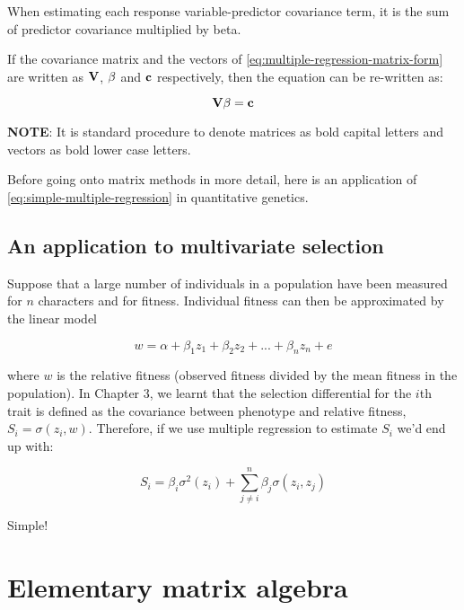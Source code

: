 \documentclass[
]{book}
\begin{document}
When estimating each response variable-predictor covariance term, it is the sum of predictor covariance multiplied by beta.

If the covariance matrix and the vectors of \eqref{eq:multiple-regression-matrix-form} are written as \(\mathbf{V}\), \(\mathbf{\beta}\) and \(\mathbf{c}\) respectively, then the equation can be re-written as:

\begin{equation}
    \mathbf{V\beta} = \mathbf{c}
    \label{eq:abbreviated-multiple-regression}
\end{equation}

\textbf{NOTE}: It is standard procedure to denote matrices as bold capital letters and vectors as bold lower case letters.

Before going onto matrix methods in more detail, here is an application of \eqref{eq:simple-multiple-regression} in quantitative genetics.

\hypertarget{an-application-to-multivariate-selection}{%
\subsection{An application to multivariate selection}\label{an-application-to-multivariate-selection}}

Suppose that a large number of individuals in a population have been measured for \(n\) characters and for fitness. Individual fitness can then be approximated by the linear model

\begin{equation}
    w = \alpha + \beta_1z_1 + \beta_2z_2 + ... + \beta_nz_n + e
    \label{eq:fitness-linear-model}
\end{equation}

where \(w\) is the relative fitness (observed fitness divided by the mean fitness in the population). In Chapter 3, we learnt that the selection differential for the \(i\)th trait is defined as the covariance between phenotype and relative fitness, \(S_i = \sigma(z_i, w)\). Therefore, if we use multiple regression to estimate \(S_i\) we'd end up with:

\begin{equation}
    S_i = \beta_i\sigma^2(z_i) + \sum^n_{j \neq i} {\beta_j\sigma(z_i, z_j)}
    \label{eq:ith-selection-differential} 
\end{equation}

Simple!

\hypertarget{elementary-matrix-algebra}{%
\section{Elementary matrix algebra}\label{elementary-matrix-algebra}}
\end{document}
